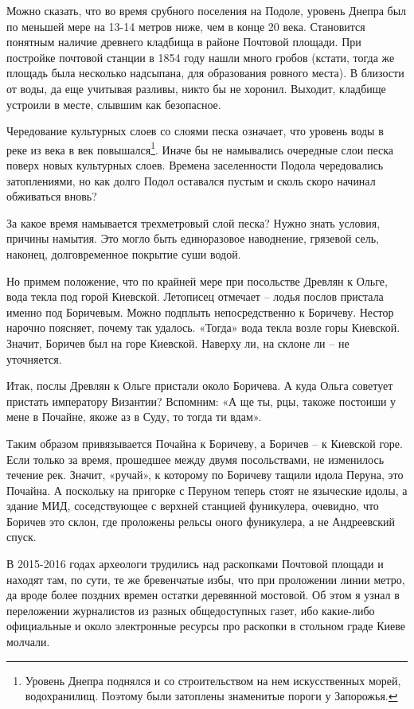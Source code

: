 Можно сказать, что во время срубного поселения на Подоле, уровень Днепра был по меньшей мере на 13-14 метров ниже, чем в конце 20 века. Становится понятным наличие древнего кладбища в районе Почтовой площади. При постройке почтовой станции в 1854 году нашли много гробов (кстати, тогда же площадь была несколько надсыпана, для образования ровного места). В близости от воды, да еще учитывая разливы, никто бы не хоронил. Выходит, кладбище устроили в месте, слывшим как безопасное.

Чередование культурных слоев со слоями песка означает, что уровень воды в реке из века в век повышался\footnote{Уровень Днепра поднялся и со строительством на нем искусственных морей, водохранилищ. Поэтому были затоплены знаменитые пороги у Запорожья.}. Иначе бы не намывались очередные слои песка поверх новых культурных слоев. Времена заселенности Подола чередовались затоплениями, но как долго Подол оставался пустым и сколь скоро начинал обживаться вновь?

За какое время намывается трехметровый слой песка? Нужно знать условия, причины намытия. Это могло быть единоразовое наводнение, грязевой сель, наконец, долговременное покрытие суши водой.

Но примем положение, что по крайней мере при посольстве Древлян к Ольге, вода текла под горой Киевской. Летописец отмечает – лодья послов пристала именно под Боричевым. Можно подплыть непосредственно к Боричеву. Нестор нарочно поясняет, почему так удалось. «Тогда» вода текла возле горы Киевской. Значит, Боричев был на горе Киевской. Наверху ли, на склоне ли – не уточняется.

Итак, послы Древлян к Ольге пристали около Боричева. А куда Ольга советует пристать императору Византии? Вспомним: «А ще ты, рцы, такоже постоиши у мене в Почайне, якоже аз в Суду, то тогда ти вдам».

Таким образом привязывается Почайна к Боричеву, а Боричев – к Киевской горе. Если только за время, прошедшее между двумя посольствами, не изменилось течение рек. Значит, «ручай», к которому по Боричеву тащили идола Перуна, это Почайна. А поскольку на пригорке с Перуном теперь  стоят не языческие идолы, а здание МИД, соседствующее с верхней станцией фуникулера, очевидно, что Боричев это склон, где проложены рельсы оного фуникулера, а не Андреевский спуск.

В 2015-2016 годах археологи трудились над раскопками Почтовой площади и находят там, по сути, те же бревенчатые избы, что при проложении линии метро, да вроде более поздних времен остатки деревянной мостовой. Об этом я узнал в переложении журналистов из разных общедоступных газет, ибо какие-либо официальные и около электронные ресурсы про раскопки в стольном граде Киеве молчали.

